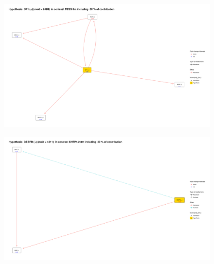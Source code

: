 \begin{figure}[!h]
    \centering
    \includegraphics[width=\textwidth, height=\textheight, keepaspectratio]{Major Thesis/figures/iut/graph/CESS6m50-SP1.png}
    \caption{}
\end{figure}

\begin{figure}[!h]
    \centering
    \includegraphics[width=\textwidth, height=\textheight, keepaspectratio]{Major Thesis/figures/iut/graph/CHTP3m-CEBPB.png.png}
    \caption{}
\end{figure}

